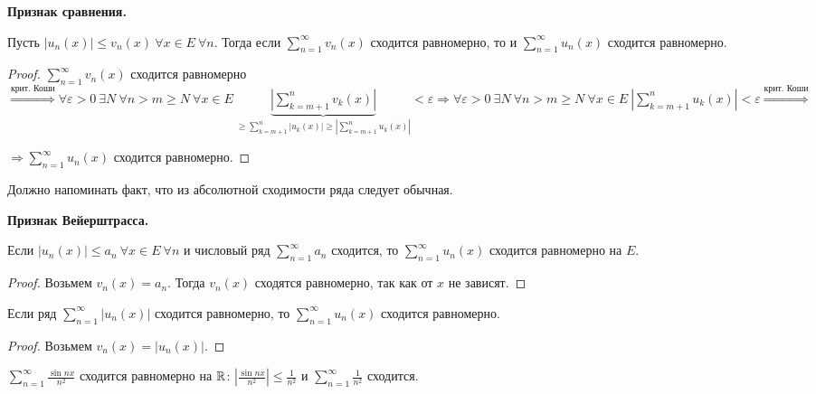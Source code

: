 \begin{theorem}
    \textbf{Признак сравнения.}

    Пусть $|u_n(x)|\leq v_n(x)\ \forall x\in E\ \forall n$. Тогда если $\sum\limits_{n=1}^\infty v_n(x)$ сходится равномерно, то и $\sum\limits_{n=1}^\infty u_n(x)$ сходится равномерно.
\end{theorem}
\begin{proof}
    $\sum\limits_{n=1}^\infty v_n(x)$ сходится равномерно $\overset{\text{крит. Коши}}{\Rightarrow} \forall \varepsilon > 0\ \exists N\ \forall n> m\geq N\ \forall x\in E\ \underbrace{|\sum\limits_{k=m+1}^n v_k(x)|}_{\geq \sum\limits_{k=m+1}^n |u_k(x)|\geq |\sum\limits_{k=m+1}^n u_k(x)|}<\varepsilon\Rightarrow\forall \varepsilon > 0\ \exists N\ \forall n> m\geq N\ \forall x\in E\ |\sum\limits_{k=m+1}^n u_k(x)|<\varepsilon\overset{\text{крит. Коши}}{\Rightarrow}$
    
    $\Rightarrow\sum\limits_{n=1}^\infty u_n(x)$ сходится равномерно.
\end{proof}

\begin{remark}
    Должно напоминать факт, что из абсолютной сходимости ряда следует обычная.
\end{remark}

\begin{corollary}
    \textbf{Признак Вейерштрасса.}

    Если $|u_n(x)|\leq a_n\ \forall x\in E\ \forall n$ и числовый ряд $\sum\limits_{n=1}^\infty a_n$ сходится, то $\sum\limits_{n=1}^\infty u_n(x)$ сходится равномерно на $E$.
\end{corollary}

\begin{proof}
    Возьмем $v_n(x)=a_n$. Тогда $v_n(x)$ сходятся равномерно, так как от $x$ не зависят.
\end{proof}

\begin{corollary}
    Если ряд $\sum\limits_{n=1}^\infty |u_n(x)|$ сходится равномерно, то $\sum\limits_{n=1}^\infty u_n(x)$ сходится равномерно.
\end{corollary}

\begin{proof}
    Возьмем $v_n(x)=|u_n(x)|$. 
\end{proof}

\begin{example}
    $\sum\limits_{n=1}^\infty \frac{\sin nx}{n^2}$ сходится равномерно на $\mathbb{R}$: $|\frac{\sin nx}{n^2}|\leq \frac{1}{n^2}$ и $\sum\limits_{n=1}^\infty \frac{1}{n^2}$ сходится.
\end{example}

